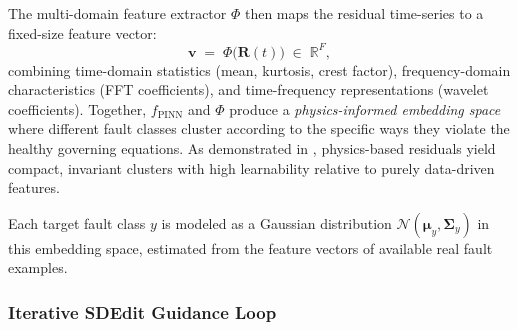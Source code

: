 \documentclass[conference]{IEEEtran}
\newcommand{\PINN}{f_{\text{PINN}}}
\newcommand{\Feat}{\Phi}
\newcommand{\bv}{\mathbf{v}}          %
\newcommand{\R}{\mathbf{R}}
\newcommand{\muvec}{\boldsymbol{\mu}}
\newcommand{\Sigmamat}{\boldsymbol{\Sigma}}
\begin{document}
The multi-domain feature extractor $\Feat$ then maps the residual time-series to a fixed-size feature vector:
\begin{equation}
  \bv \;=\; \Feat\!\bigl(\R(t)\bigr) \;\in\; \mathbb{R}^F,
  \label{eq:features}
\end{equation}
combining time-domain statistics (mean, kurtosis, crest factor), frequency-domain characteristics (FFT coefficients), and time-frequency representations (wavelet coefficients). Together, $\PINN$ and $\Feat$ produce a \emph{physics-informed embedding space} where different fault classes cluster according to the specific ways they violate the healthy governing equations. As demonstrated in \cite{spotorno2026linking}, physics-based residuals yield compact, invariant clusters with high learnability relative to purely data-driven features.

Each target fault class $y$ is modeled as a Gaussian distribution $\mathcal{N}(\muvec_y,\Sigmamat_y)$ in this embedding space, estimated from the feature vectors of available real fault examples.


\subsubsection{Iterative SDEdit Guidance Loop}

\end{document}
